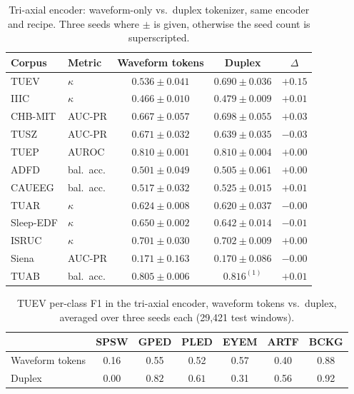 \begin{table}[h]
\centering
\small
\caption{Tri-axial encoder: waveform-only vs.\ duplex tokenizer, same
encoder and recipe. Three seeds where $\pm$ is given, otherwise the seed
count is superscripted.}
\label{tab:coupling-triaxial}
\begin{tabular}{llccc}
\toprule
Corpus & Metric & Waveform tokens & Duplex & $\Delta$ \\
\midrule
TUEV & $\kappa$ & $0.536 \pm 0.041$ & $0.690 \pm 0.036$ & $+0.15$ \\
IIIC & $\kappa$ & $0.466 \pm 0.010$ & $0.479 \pm 0.009$ & $+0.01$ \\
CHB-MIT & AUC-PR & $0.667 \pm 0.057$ & $0.698 \pm 0.055$ & $+0.03$ \\
TUSZ & AUC-PR & $0.671 \pm 0.032$ & $0.639 \pm 0.035$ & $-0.03$ \\
TUEP & AUROC & $0.810 \pm 0.001$ & $0.810 \pm 0.004$ & $+0.00$ \\
ADFD & bal.\ acc. & $0.501 \pm 0.049$ & $0.505 \pm 0.061$ & $+0.00$ \\
CAUEEG & bal.\ acc. & $0.517 \pm 0.032$ & $0.525 \pm 0.015$ & $+0.01$ \\
TUAR & $\kappa$ & $0.624 \pm 0.008$ & $0.620 \pm 0.037$ & $-0.00$ \\
Sleep-EDF & $\kappa$ & $0.650 \pm 0.002$ & $0.642 \pm 0.014$ & $-0.01$ \\
ISRUC & $\kappa$ & $0.701 \pm 0.030$ & $0.702 \pm 0.009$ & $+0.00$ \\
Siena & AUC-PR & $0.171 \pm 0.163$ & $0.170 \pm 0.086$ & $-0.00$ \\
TUAB & bal.\ acc. & $0.805 \pm 0.006$ & $0.816^{(1)}$ & $+0.01$ \\
\bottomrule
\end{tabular}
\end{table}

\begin{table}[h]
\centering
\small
\caption{TUEV per-class F1 in the tri-axial encoder, waveform tokens vs.\
duplex, averaged over three seeds each (29,421 test windows).}
\label{tab:perclass}
\begin{tabular}{lcccccc}
\toprule
 & SPSW & GPED & PLED & EYEM & ARTF & BCKG \\
\midrule
Waveform tokens & 0.16 & 0.55 & 0.52 & 0.57 & 0.40 & 0.88 \\
Duplex & 0.00 & $\mathbf{0.82}$ & $\mathbf{0.61}$ & 0.31 & 0.56 & 0.92 \\
\bottomrule
\end{tabular}
\end{table}

